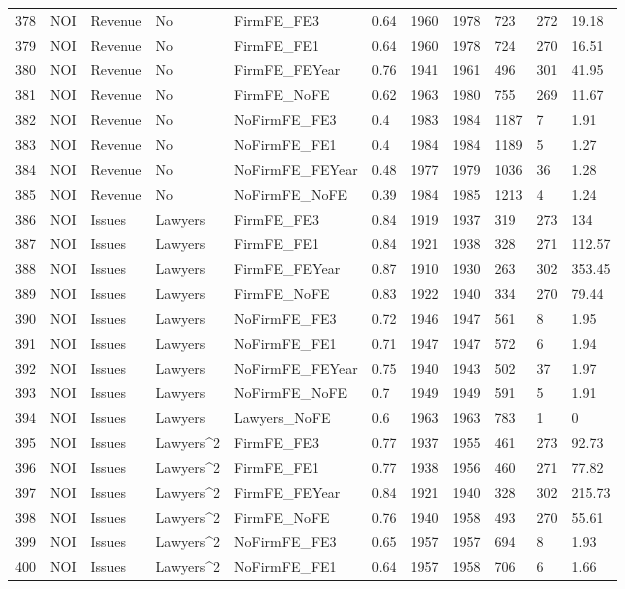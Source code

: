 \begin{table}[ht]
\begin{tabular}{rllllllllll}
  378 & NOI & Revenue & No & FirmFE\_FE3 & 0.64 & 1960 & 1978 & 723 & 272 & 19.18 \\ 
  379 & NOI & Revenue & No & FirmFE\_FE1 & 0.64 & 1960 & 1978 & 724 & 270 & 16.51 \\ 
  380 & NOI & Revenue & No & FirmFE\_FEYear & 0.76 & 1941 & 1961 & 496 & 301 & 41.95 \\ 
  381 & NOI & Revenue & No & FirmFE\_NoFE & 0.62 & 1963 & 1980 & 755 & 269 & 11.67 \\ 
  382 & NOI & Revenue & No & NoFirmFE\_FE3 & 0.4 & 1983 & 1984 & 1187 & 7 & 1.91 \\ 
  383 & NOI & Revenue & No & NoFirmFE\_FE1 & 0.4 & 1984 & 1984 & 1189 & 5 & 1.27 \\ 
  384 & NOI & Revenue & No & NoFirmFE\_FEYear & 0.48 & 1977 & 1979 & 1036 & 36 & 1.28 \\ 
  385 & NOI & Revenue & No & NoFirmFE\_NoFE & 0.39 & 1984 & 1985 & 1213 & 4 & 1.24 \\ 
  386 & NOI & Issues & Lawyers & FirmFE\_FE3 & 0.84 & 1919 & 1937 & 319 & 273 & 134 \\ 
  387 & NOI & Issues & Lawyers & FirmFE\_FE1 & 0.84 & 1921 & 1938 & 328 & 271 & 112.57 \\ 
  388 & NOI & Issues & Lawyers & FirmFE\_FEYear & 0.87 & 1910 & 1930 & 263 & 302 & 353.45 \\ 
  389 & NOI & Issues & Lawyers & FirmFE\_NoFE & 0.83 & 1922 & 1940 & 334 & 270 & 79.44 \\ 
  390 & NOI & Issues & Lawyers & NoFirmFE\_FE3 & 0.72 & 1946 & 1947 & 561 & 8 & 1.95 \\ 
  391 & NOI & Issues & Lawyers & NoFirmFE\_FE1 & 0.71 & 1947 & 1947 & 572 & 6 & 1.94 \\ 
  392 & NOI & Issues & Lawyers & NoFirmFE\_FEYear & 0.75 & 1940 & 1943 & 502 & 37 & 1.97 \\ 
  393 & NOI & Issues & Lawyers & NoFirmFE\_NoFE & 0.7 & 1949 & 1949 & 591 & 5 & 1.91 \\ 
  394 & NOI & Issues & Lawyers & Lawyers\_NoFE & 0.6 & 1963 & 1963 & 783 & 1 & 0 \\ 
  395 & NOI & Issues & Lawyers^2 & FirmFE\_FE3 & 0.77 & 1937 & 1955 & 461 & 273 & 92.73 \\ 
  396 & NOI & Issues & Lawyers^2 & FirmFE\_FE1 & 0.77 & 1938 & 1956 & 460 & 271 & 77.82 \\ 
  397 & NOI & Issues & Lawyers^2 & FirmFE\_FEYear & 0.84 & 1921 & 1940 & 328 & 302 & 215.73 \\ 
  398 & NOI & Issues & Lawyers^2 & FirmFE\_NoFE & 0.76 & 1940 & 1958 & 493 & 270 & 55.61 \\ 
  399 & NOI & Issues & Lawyers^2 & NoFirmFE\_FE3 & 0.65 & 1957 & 1957 & 694 & 8 & 1.93 \\ 
  400 & NOI & Issues & Lawyers^2 & NoFirmFE\_FE1 & 0.64 & 1957 & 1958 & 706 & 6 & 1.66 \\ 
   \hline
\end{tabular}
\end{table}
